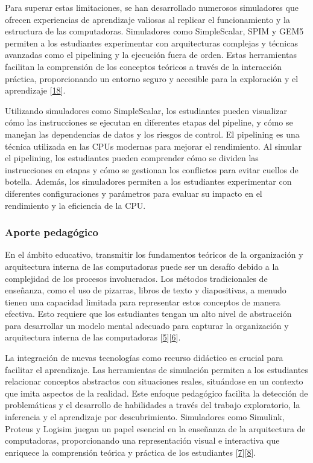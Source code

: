 \documentclass[12pt,twoside]{templates/unerthesis}
\begin{document}
Para superar estas limitaciones, se han desarrollado numerosos simuladores que ofrecen experiencias de aprendizaje valiosas al replicar el funcionamiento y la estructura de las computadoras. Simuladores como SimpleScalar, SPIM y GEM5 permiten a los estudiantes experimentar con arquitecturas complejas y técnicas avanzadas como el pipelining y la ejecución fuera de orden. Estas herramientas facilitan la comprensión de los conceptos teóricos a través de la interacción práctica, proporcionando un entorno seguro y accesible para la exploración y el aprendizaje {[}\protect\hyperlink{ref-skrien_cpu_2001}{18}{]}.

Utilizando simuladores como SimpleScalar, los estudiantes pueden visualizar cómo las instrucciones se ejecutan en diferentes etapas del pipeline, y cómo se manejan las dependencias de datos y los riesgos de control. El pipelining es una técnica utilizada en las CPUs modernas para mejorar el rendimiento. Al simular el pipelining, los estudiantes pueden comprender cómo se dividen las instrucciones en etapas y cómo se gestionan los conflictos para evitar cuellos de botella. Además, los simuladores permiten a los estudiantes experimentar con diferentes configuraciones y parámetros para evaluar su impacto en el rendimiento y la eficiencia de la CPU.

\hypertarget{aporte-pedaguxf3gico}{%
\subsubsection{Aporte pedagógico}\label{aporte-pedaguxf3gico}}

En el ámbito educativo, transmitir los fundamentos teóricos de la organización y arquitectura interna de las computadoras puede ser un desafío debido a la complejidad de los procesos involucrados. Los métodos tradicionales de enseñanza, como el uso de pizarras, libros de texto y diapositivas, a menudo tienen una capacidad limitada para representar estos conceptos de manera efectiva. Esto requiere que los estudiantes tengan un alto nivel de abstracción para desarrollar un modelo mental adecuado para capturar la organización y arquitectura interna de las computadoras {[}\protect\hyperlink{ref-lion_simuladores_2005}{5}{]}{[}\protect\hyperlink{ref-contreras_uso_2010}{6}{]}.

La integración de nuevas tecnologías como recurso didáctico es crucial para facilitar el aprendizaje. Las herramientas de simulación permiten a los estudiantes relacionar conceptos abstractos con situaciones reales, situándose en un contexto que imita aspectos de la realidad. Este enfoque pedagógico facilita la detección de problemáticas y el desarrollo de habilidades a través del trabajo exploratorio, la inferencia y el aprendizaje por descubrimiento. Simuladores como Simulink, Proteus y Logisim juegan un papel esencial en la enseñanza de la arquitectura de computadoras, proporcionando una representación visual e interactiva que enriquece la comprensión teórica y práctica de los estudiantes {[}\protect\hyperlink{ref-garcia-garcia_pbbcache_2020}{7}{]}{[}\protect\hyperlink{ref-nova_tool_2013}{8}{]}.
\end{document}
